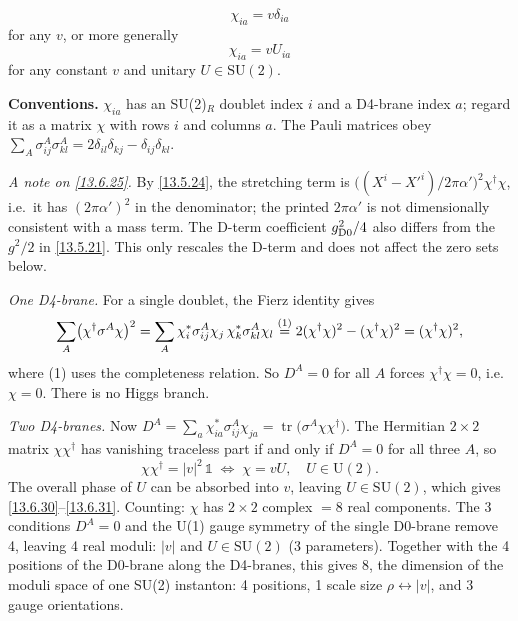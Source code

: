 \begin{equation}
	\chi_{ia} = v\delta_{ia} \label{13.6.30}
\end{equation}
for any $v$, or more generally
\begin{equation}
	\chi_{ia} = v U_{ia} \label{13.6.31}
\end{equation}
for any constant $v$ and unitary $U \in \mathrm{SU}(2)$.
\begin{tcolorbox}[breakable]
	\begin{remark}
		\textbf{Conventions.} $\chi_{ia}$ has an SU(2)$_R$ doublet index $i$ and a D4-brane index $a$; regard it as a matrix $\chi$ with rows $i$ and columns $a$. The Pauli matrices obey $\sum_A\sigma^A_{ij}\sigma^A_{kl}=2\delta_{il}\delta_{kj}-\delta_{ij}\delta_{kl}$.

		\textit{A note on \eqref{13.6.25}.} By \eqref{13.5.24}, the stretching term is $\bigl((X^i-X'^i)/2\pi\alpha'\bigr)^2\chi^\dagger\chi$, i.e.\ it has $(2\pi\alpha')^2$ in the denominator; the printed $2\pi\alpha'$ is not dimensionally consistent with a mass term. The D-term coefficient $g_{\rm D0}^2/4$ also differs from the $g^2/2$ in \eqref{13.5.21}. This only rescales the D-term and does not affect the zero sets below.

		\textit{One D4-brane.} For a single doublet, the Fierz identity gives
		\begin{equation*}
			\sum_A\bigl(\chi^\dagger\sigma^A\chi\bigr)^2 = \sum_A\chi^*_i\sigma^A_{ij}\chi_j\,\chi^*_k\sigma^A_{kl}\chi_l \overset{(1)}{=} 2(\chi^\dagger\chi)^2-(\chi^\dagger\chi)^2 = (\chi^\dagger\chi)^2 ,
		\end{equation*}
		where (1) uses the completeness relation. So $D^A=0$ for all $A$ forces $\chi^\dagger\chi=0$, i.e.\ $\chi=0$. There is no Higgs branch.

		\textit{Two D4-branes.} Now $D^A=\sum_a\chi^*_{ia}\sigma^A_{ij}\chi_{ja}=\operatorname{tr}\bigl(\sigma^A\chi\chi^\dagger\bigr)$. The Hermitian $2\times2$ matrix $\chi\chi^\dagger$ has vanishing traceless part if and only if $D^A=0$ for all three $A$, so
		\begin{equation*}
			\chi\chi^\dagger = |v|^2\,\mathbb 1 \;\Longleftrightarrow\; \chi = vU,\quad U\in\mathrm U(2) .
		\end{equation*}
		The overall phase of $U$ can be absorbed into $v$, leaving $U\in\mathrm{SU}(2)$, which gives \eqref{13.6.30}--\eqref{13.6.31}. Counting: $\chi$ has $2\times2$ complex $=8$ real components. The 3 conditions $D^A=0$ and the U(1) gauge symmetry of the single D0-brane remove 4, leaving 4 real moduli: $|v|$ and $U\in\mathrm{SU}(2)$ (3 parameters). Together with the 4 positions of the D0-brane along the D4-branes, this gives 8, the dimension of the moduli space of one SU(2) instanton: 4 positions, 1 scale size $\rho\leftrightarrow|v|$, and 3 gauge orientations.
	\end{remark}
\end{tcolorbox}

